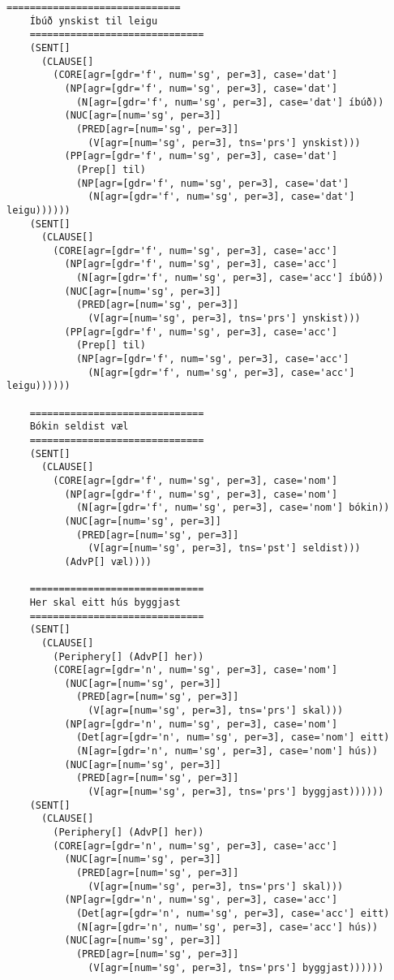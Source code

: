 \documentclass[12pt,%
]{lin-v2/lin}
\begin{document}
\begin{lstlisting}[caption={The parse trees returned by the parser.}, label=results]
    ==============================
    Íbúð ynskist til leigu
    ==============================
    (SENT[]
      (CLAUSE[]
        (CORE[agr=[gdr='f', num='sg', per=3], case='dat']
          (NP[agr=[gdr='f', num='sg', per=3], case='dat']
            (N[agr=[gdr='f', num='sg', per=3], case='dat'] íbúð))
          (NUC[agr=[num='sg', per=3]]
            (PRED[agr=[num='sg', per=3]]
              (V[agr=[num='sg', per=3], tns='prs'] ynskist)))
          (PP[agr=[gdr='f', num='sg', per=3], case='dat']
            (Prep[] til)
            (NP[agr=[gdr='f', num='sg', per=3], case='dat']
              (N[agr=[gdr='f', num='sg', per=3], case='dat'] leigu))))))
    (SENT[]
      (CLAUSE[]
        (CORE[agr=[gdr='f', num='sg', per=3], case='acc']
          (NP[agr=[gdr='f', num='sg', per=3], case='acc']
            (N[agr=[gdr='f', num='sg', per=3], case='acc'] íbúð))
          (NUC[agr=[num='sg', per=3]]
            (PRED[agr=[num='sg', per=3]]
              (V[agr=[num='sg', per=3], tns='prs'] ynskist)))
          (PP[agr=[gdr='f', num='sg', per=3], case='acc']
            (Prep[] til)
            (NP[agr=[gdr='f', num='sg', per=3], case='acc']
              (N[agr=[gdr='f', num='sg', per=3], case='acc'] leigu))))))
    
    ==============================
    Bókin seldist væl
    ==============================
    (SENT[]
      (CLAUSE[]
        (CORE[agr=[gdr='f', num='sg', per=3], case='nom']
          (NP[agr=[gdr='f', num='sg', per=3], case='nom']
            (N[agr=[gdr='f', num='sg', per=3], case='nom'] bókin))
          (NUC[agr=[num='sg', per=3]]
            (PRED[agr=[num='sg', per=3]]
              (V[agr=[num='sg', per=3], tns='pst'] seldist)))
          (AdvP[] væl))))
    
    ==============================
    Her skal eitt hús byggjast
    ==============================
    (SENT[]
      (CLAUSE[]
        (Periphery[] (AdvP[] her))
        (CORE[agr=[gdr='n', num='sg', per=3], case='nom']
          (NUC[agr=[num='sg', per=3]]
            (PRED[agr=[num='sg', per=3]]
              (V[agr=[num='sg', per=3], tns='prs'] skal)))
          (NP[agr=[gdr='n', num='sg', per=3], case='nom']
            (Det[agr=[gdr='n', num='sg', per=3], case='nom'] eitt)
            (N[agr=[gdr='n', num='sg', per=3], case='nom'] hús))
          (NUC[agr=[num='sg', per=3]]
            (PRED[agr=[num='sg', per=3]]
              (V[agr=[num='sg', per=3], tns='prs'] byggjast))))))
    (SENT[]
      (CLAUSE[]
        (Periphery[] (AdvP[] her))
        (CORE[agr=[gdr='n', num='sg', per=3], case='acc']
          (NUC[agr=[num='sg', per=3]]
            (PRED[agr=[num='sg', per=3]]
              (V[agr=[num='sg', per=3], tns='prs'] skal)))
          (NP[agr=[gdr='n', num='sg', per=3], case='acc']
            (Det[agr=[gdr='n', num='sg', per=3], case='acc'] eitt)
            (N[agr=[gdr='n', num='sg', per=3], case='acc'] hús))
          (NUC[agr=[num='sg', per=3]]
            (PRED[agr=[num='sg', per=3]]
              (V[agr=[num='sg', per=3], tns='prs'] byggjast))))))
    

\end{lstlisting}
\end{document}

